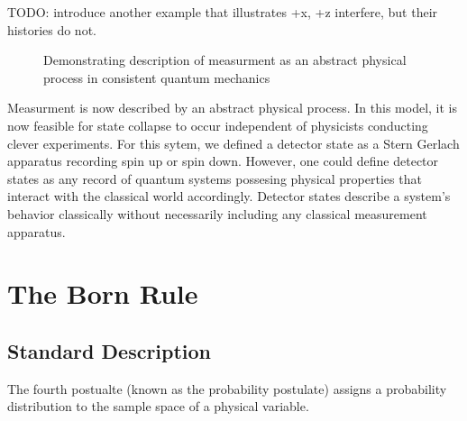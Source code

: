 TODO: introduce another example that illustrates +x, +z interfere, but their histories do not.

\begin{figure}
\centering\CaptionFontSize
{}
\caption[Insert an abbreviated caption here to show in the List of Figures]
{Demonstrating description of measurment as an abstract physical process in consistent quantum mechanics}
\label{Figure:Measurement:DetectorStates}
\end{figure}

Measurment is now described by an abstract physical process. In this model, it is now feasible for state collapse to occur independent of physicists conducting clever experiments. For this sytem, we defined a detector state as a Stern Gerlach apparatus recording spin up or spin down. However, one could define detector states as any record of quantum systems possesing physical properties that interact with the classical world accordingly. Detector states describe a system's behavior classically without necessarily including any classical measurement apparatus.

\section{The Born Rule}
\subsection{Standard Description}
The fourth postualte (known as the probability postulate) assigns a probability distribution to the sample space of a physical variable.

